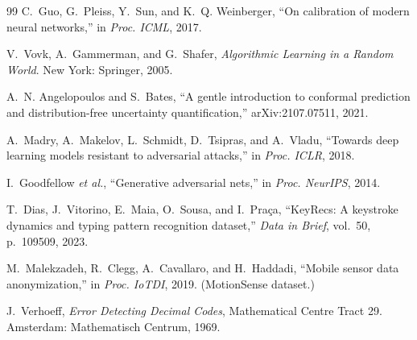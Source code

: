 \documentclass[conference]{IEEEtran}
\begin{document}
\begin{thebibliography}{99}
C.~Guo, G.~Pleiss, Y.~Sun, and K.~Q. Weinberger, ``On calibration of modern neural networks,'' in \emph{Proc. ICML}, 2017.

V.~Vovk, A.~Gammerman, and G.~Shafer, \emph{Algorithmic Learning in a Random World}. New York: Springer, 2005.

A.~N. Angelopoulos and S.~Bates, ``A gentle introduction to conformal prediction and distribution-free uncertainty quantification,'' arXiv:2107.07511, 2021.

A.~Madry, A.~Makelov, L.~Schmidt, D.~Tsipras, and A.~Vladu, ``Towards deep learning models resistant to adversarial attacks,'' in \emph{Proc. ICLR}, 2018.

I.~Goodfellow \emph{et al.}, ``Generative adversarial nets,'' in \emph{Proc. NeurIPS}, 2014.

T.~Dias, J.~Vitorino, E.~Maia, O.~Sousa, and I.~Pra\c{c}a, ``KeyRecs: A keystroke dynamics and typing pattern recognition dataset,'' \emph{Data in Brief}, vol.~50, p.~109509, 2023.

M.~Malekzadeh, R.~Clegg, A.~Cavallaro, and H.~Haddadi, ``Mobile sensor data anonymization,'' in \emph{Proc. IoTDI}, 2019. (MotionSense dataset.)

J.~Verhoeff, \emph{Error Detecting Decimal Codes}, Mathematical Centre Tract 29. Amsterdam: Mathematisch Centrum, 1969.

\end{thebibliography}
\end{document}
